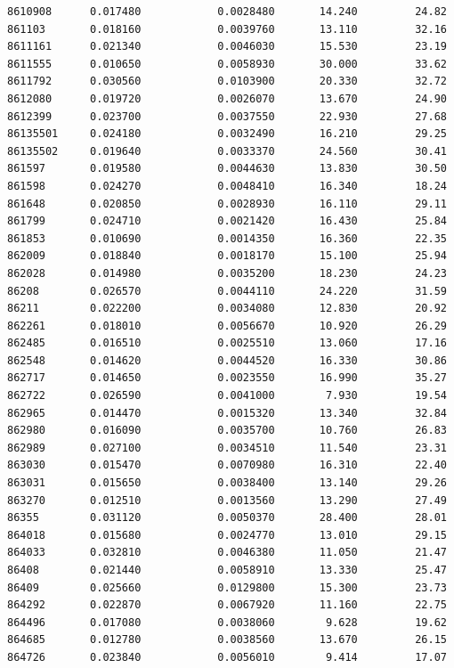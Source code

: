\documentclass[
  letterpaper,
  DIV=11,
  numbers=noendperiod]{scrartcl}
\begin{document}
\begin{verbatim}
8610908      0.017480            0.0028480       14.240         24.82
861103       0.018160            0.0039760       13.110         32.16
8611161      0.021340            0.0046030       15.530         23.19
8611555      0.010650            0.0058930       30.000         33.62
8611792      0.030560            0.0103900       20.330         32.72
8612080      0.019720            0.0026070       13.670         24.90
8612399      0.023700            0.0037550       22.930         27.68
86135501     0.024180            0.0032490       16.210         29.25
86135502     0.019640            0.0033370       24.560         30.41
861597       0.019580            0.0044630       13.830         30.50
861598       0.024270            0.0048410       16.340         18.24
861648       0.020850            0.0028930       16.110         29.11
861799       0.024710            0.0021420       16.430         25.84
861853       0.010690            0.0014350       16.360         22.35
862009       0.018840            0.0018170       15.100         25.94
862028       0.014980            0.0035200       18.230         24.23
86208        0.026570            0.0044110       24.220         31.59
86211        0.022200            0.0034080       12.830         20.92
862261       0.018010            0.0056670       10.920         26.29
862485       0.016510            0.0025510       13.060         17.16
862548       0.014620            0.0044520       16.330         30.86
862717       0.014650            0.0023550       16.990         35.27
862722       0.026590            0.0041000        7.930         19.54
862965       0.014470            0.0015320       13.340         32.84
862980       0.016090            0.0035700       10.760         26.83
862989       0.027100            0.0034510       11.540         23.31
863030       0.015470            0.0070980       16.310         22.40
863031       0.015650            0.0038400       13.140         29.26
863270       0.012510            0.0013560       13.290         27.49
86355        0.031120            0.0050370       28.400         28.01
864018       0.015680            0.0024770       13.010         29.15
864033       0.032810            0.0046380       11.050         21.47
86408        0.021440            0.0058910       13.330         25.47
86409        0.025660            0.0129800       15.300         23.73
864292       0.022870            0.0067920       11.160         22.75
864496       0.017080            0.0038060        9.628         19.62
864685       0.012780            0.0038560       13.670         26.15
864726       0.023840            0.0056010        9.414         17.07

\end{verbatim}
\end{document}
